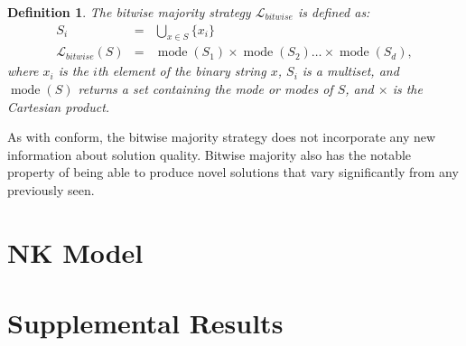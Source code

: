 \documentclass[twocolumn,10pt]{article}
\newtheorem{definition}{Definition}
\DeclareMathOperator{\mode}{mode}
\begin{document}
\begin{definition}
The bitwise majority strategy $\mathcal{L}_{bitwise}$ is defined as:
\begin{eqnarray}
S_i &=& \bigcup_{x \in S} \{x_i\} \\
\mathcal{L}_{bitwise}(S)
&=& \mode(S_1) \times \mode(S_2) \ldots \times \mode(S_d),
\end{eqnarray}
where $x_i$ is the $i$th element of the binary string $x$,
$S_i$ is a multiset, and $\mode(S)$ returns a set containing the mode or modes of $S$, and $\times$ is the Cartesian product.
\end{definition}
As with conform, the bitwise majority strategy does not incorporate any new information about solution quality.
Bitwise majority also has the notable property of being able to produce novel solutions that vary significantly from any previously seen.

\fi

\section{NK Model}
\label{subsec:task}
\section{Supplemental Results}





\end{document}
